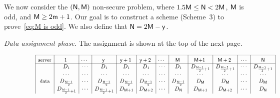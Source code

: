 \documentclass[conference,letterpaper]{IEEEtran}
\begin{document}
We now consider the $({\sf N}, {\sf M})$ non-secure problem, where $1.5 {\sf M} \leq {\sf N} < 2{\sf M}$, ${\sf M}$ is odd, and ${\sf M} \geq 2{\sf m} + 1$. Our goal is to construct a scheme (Scheme~3) to prove~\eqref{eq:M is odd}.
We also define that ${\sf N}=2{\sf M}-{\sf y}$. 

{\it Data assignment phase.}
The assignment is shown at the top of the next page.
\begin{figure}
\begin{align*}
\begin{array}{rl|c|c|c|c|c|c|c|c|c|c|c|c|}\cline{3-3}\cline{4-4}\cline{5-5}\cline{6-6}\cline{7-7}\cline{8-8}\cline{9-9}\cline{10-10}\cline{11-11}\cline{12-12}\cline{13-13}\cline{14-14}
&&\rule{0pt}{1.2em}\mbox{\small server} &\rule{0pt}{1.2em}\mbox{\small \negmedspace\negmedspace 1 \negmedspace\negmedspace} & \mbox{\small \negmedspace\negmedspace $\cdots$ \negmedspace\negmedspace} &  \rule{0pt}{1.2em}\mbox{\small \negmedspace\negmedspace $\ysf$ \negmedspace\negmedspace}& \rule{0pt}{1.2em}\mbox{\small \negmedspace\negmedspace  $\ysf +1$ \negmedspace\negmedspace}&  \rule{0pt}{1.2em}\mbox{\small \negmedspace\negmedspace  $\ysf+2$ \negmedspace\negmedspace}&  \rule{0pt}{1.2em}\mbox{\small \negmedspace\negmedspace $\cdots$ \negmedspace\negmedspace} &  \rule{0pt}{1.2em}\mbox{\small \negmedspace\negmedspace $\Msf$ \negmedspace\negmedspace} &\rule{0pt}{1.2em}\mbox{\small \negmedspace\negmedspace  $\Msf$+1 \negmedspace\negmedspace} & \rule{0pt}{1.2em}\mbox{\small \negmedspace\negmedspace  $\Msf+2$ \negmedspace\negmedspace} & \rule{0pt}{1.2em}\mbox{\small \negmedspace\negmedspace $\cdots$\negmedspace\negmedspace }& \rule{0pt}{1.2em}\mbox{\small \negmedspace\negmedspace $\Nsf$\negmedspace\negmedspace} \\ 
\cline{3-3}\cline{4-4}\cline{5-5}\cline{6-6}\cline{7-7}\cline{8-8}\cline{9-9}\cline{10-10}\cline{11-11}\cline{12-12}\cline{13-13}\cline{14-14}
&& &D_1& \cdots       &   D_1 &  D_{1} &  D_{1} & \cdots &  D_{1}   &  D_{\frac{\Msf-1}{2}+1}   &  D_{\frac{\Msf-1}{2}+1} &  \cdots  &  D_{\frac{\Msf-1}{2}+1}  \\
&& &\cdots & \cdots & \cdots &  \cdots & \cdots  & \cdots   & \cdots  & \cdots & \cdots & \cdots & \cdots  \\ 
&& \mbox{\small data}&D_{\frac{\Msf-1}{2}} &    \cdots    & D_{\frac{\Msf-1}{2}}  & D_{\frac{\Msf-1}{2}} & D_{\frac{\Msf-1}{2}}    & \cdots  & D_{\frac{\Msf-1}{2}} &   D_{\Msf}  &   D_{\Msf}  &  \cdots  &  D_{\Msf}  \\
&& &D_{\frac{\Msf-1}{2}+1}&  \cdots  & D_{\frac{\Msf-1}{2}+1}  & D_{\Msf+1} & D_{\Msf+2} & \cdots & D_{\Nsf}& D_{\Msf+1}  &  D_{\Msf+2} &   \cdots  &  D_{\Nsf} \\ 

\end{array}
\end{align*}
\end{figure}
\end{document}
